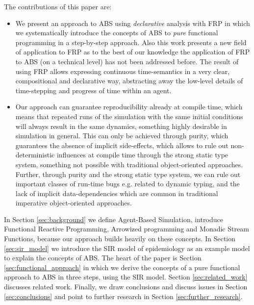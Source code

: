 The contributions of this paper are:
\begin{itemize}
	\item We present an approach to ABS using \textit{declarative} analysis with FRP in which we systematically introduce the concepts of ABS to \textit{pure} functional programming in a step-by-step approach. Also this work presents a new field of application to FRP as to the best of our knowledge the application of FRP to ABS (on a technical level) has not been addressed before. The result of using FRP allows expressing continuous time-semantics in a very clear, compositional and declarative way, abstracting away the low-level details of time-stepping and progress of time within an agent.
	
	\item Our approach can guarantee reproducibility already at compile time, which means that repeated runs of the simulation with the same initial conditions will always result in the same dynamics, something highly desirable in simulation in general. This can only be achieved through purity, which guarantees the absence of implicit side-effects, which allows to rule out non-deterministic influences at compile time through the strong static type system, something not possible with traditional object-oriented approaches. Further, through purity and the strong static type system, we can rule out important classes of run-time bugs e.g. related to dynamic typing, and the lack of implicit data-dependencies which are common in traditional imperative object-oriented approaches.
\end{itemize}

In Section \ref{sec:background} we define Agent-Based Simulation, introduce Functional Reactive Programming, Arrowized programming and Monadic Stream Functions, because our approach builds heavily on these concepts. In Section \ref{sec:sir_model} we introduce the SIR model of epidemiology as an example model to explain the concepts of ABS. The heart of the paper is Section \ref{sec:functional_approach} in which we derive the concepts of a pure functional approach to ABS in three steps, using the SIR model. Section \ref{sec:related_work} discusses related work. Finally, we draw conclusions and discuss issues in Section \ref{sec:conclusions} and point to further research in Section \ref{sec:further_research}.